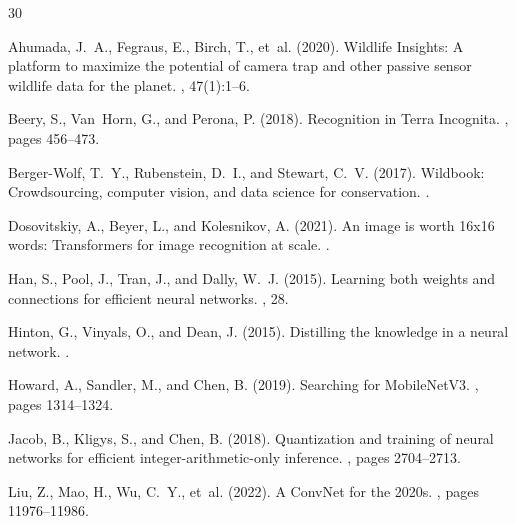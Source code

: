 \begin{thebibliography}{30}

Ahumada, J.~A., Fegraus, E., Birch, T., et~al. (2020).
\newblock Wildlife Insights: A platform to maximize the potential of camera trap and other passive sensor wildlife data for the planet.
, 47(1):1--6.

Beery, S., Van~Horn, G., and Perona, P. (2018).
\newblock Recognition in Terra Incognita.
, pages 456--473.

Berger-Wolf, T.~Y., Rubenstein, D.~I., and Stewart, C.~V. (2017).
\newblock Wildbook: Crowdsourcing, computer vision, and data science for conservation.
.

Dosovitskiy, A., Beyer, L., and Kolesnikov, A. (2021).
\newblock An image is worth 16x16 words: Transformers for image recognition at scale.
.

Han, S., Pool, J., Tran, J., and Dally, W.~J. (2015).
\newblock Learning both weights and connections for efficient neural networks.
, 28.

Hinton, G., Vinyals, O., and Dean, J. (2015).
\newblock Distilling the knowledge in a neural network.
.

Howard, A., Sandler, M., and Chen, B. (2019).
\newblock Searching for MobileNetV3.
, pages 1314--1324.

Jacob, B., Kligys, S., and Chen, B. (2018).
\newblock Quantization and training of neural networks for efficient integer-arithmetic-only inference.
, pages 2704--2713.

Liu, Z., Mao, H., Wu, C.~Y., et~al. (2022).
\newblock A ConvNet for the 2020s.
, pages 11976--11986.


\end{thebibliography}
